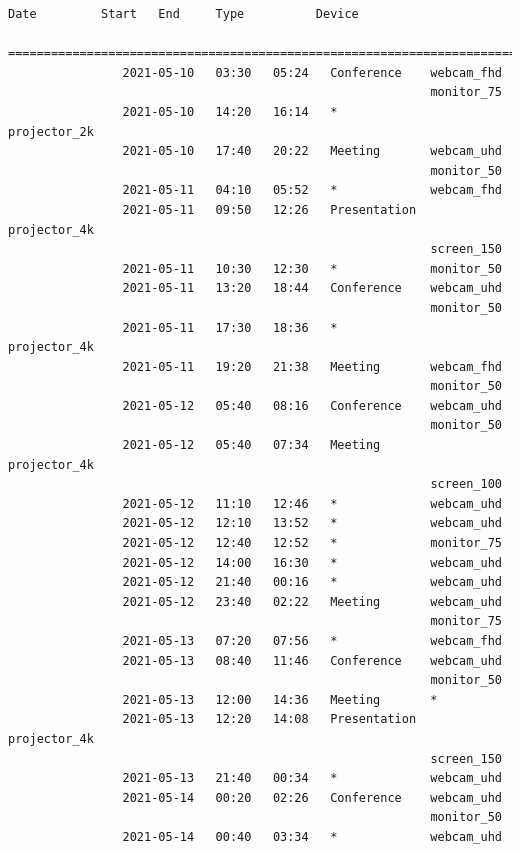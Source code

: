\documentclass{article}
\begin{document}
\begin{Verbatim}[gobble=8]
                Date         Start   End     Type          Device
                ===========================================================================
                2021-05-10   03:30   05:24   Conference    webcam_fhd
                                                           monitor_75
                2021-05-10   14:20   16:14   *             projector_2k
                2021-05-10   17:40   20:22   Meeting       webcam_uhd
                                                           monitor_50
                2021-05-11   04:10   05:52   *             webcam_fhd
                2021-05-11   09:50   12:26   Presentation  projector_4k
                                                           screen_150
                2021-05-11   10:30   12:30   *             monitor_50
                2021-05-11   13:20   18:44   Conference    webcam_uhd
                                                           monitor_50
                2021-05-11   17:30   18:36   *             projector_4k
                2021-05-11   19:20   21:38   Meeting       webcam_fhd
                                                           monitor_50
                2021-05-12   05:40   08:16   Conference    webcam_uhd
                                                           monitor_50
                2021-05-12   05:40   07:34   Meeting       projector_4k
                                                           screen_100
                2021-05-12   11:10   12:46   *             webcam_uhd
                2021-05-12   12:10   13:52   *             webcam_uhd
                2021-05-12   12:40   12:52   *             monitor_75
                2021-05-12   14:00   16:30   *             webcam_uhd
                2021-05-12   21:40   00:16   *             webcam_uhd
                2021-05-12   23:40   02:22   Meeting       webcam_uhd
                                                           monitor_75
                2021-05-13   07:20   07:56   *             webcam_fhd
                2021-05-13   08:40   11:46   Conference    webcam_uhd
                                                           monitor_50
                2021-05-13   12:00   14:36   Meeting       *
                2021-05-13   12:20   14:08   Presentation  projector_4k
                                                           screen_150
                2021-05-13   21:40   00:34   *             webcam_uhd
                2021-05-14   00:20   02:26   Conference    webcam_uhd
                                                           monitor_50
                2021-05-14   00:40   03:34   *             webcam_uhd

\end{Verbatim}
\end{document}
